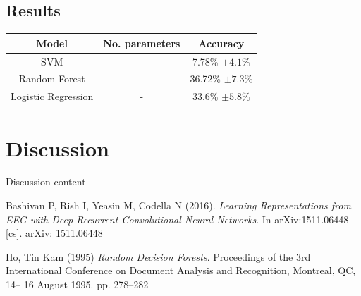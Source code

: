 \documentclass{article}
\begin{document}
\subsection{Results}
\begin{center}
\begin{tabular}{ c|c|c } 
 Model & No. parameters & Accuracy \\ 
 \hline
 SVM & - & 7.78\% $\pm 4.1\% $\\ 
 Random Forest & - & 36.72\% $\pm 7.3\%$ \\ 
 Logistic Regression & - & 33.6\% $\pm 5.8\%$ \\ 
\end{tabular}
\end{center}

\section{Discussion}
Discussion content

\begin{thebibliography}{9}

	Bashivan  P,  Rish  I,  Yeasin  M,  Codella  N  (2016). 
	\textit{Learning  Representations from  EEG with  Deep Recurrent-Convolutional  Neural Networks}. 
	In arXiv:1511.06448 [cs]. arXiv: 1511.06448

	Ho, Tin Kam (1995)
	\textit{Random Decision Forests}. 
	Proceedings of the 3rd International Conference on Document Analysis and Recognition, Montreal, QC, 14–		16 August 1995. pp. 278–282
	
\end{thebibliography}
\end{document}
